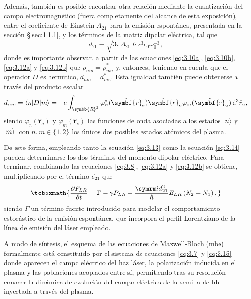 Además, también es posible encontrar otra relación mediante la cuantización del campo electromagnético \autocite{Cohen-Tannoudji2019b} (fuera completamente del alcance de esta exposición), entre el coeficiente de Einstein $A_{21}$ para la emisión espontánea, presentada en la sección \S\ref{sec:1.1.1}, y los términos de la matriz dipolar eléctrica, tal que 
\begin{equation}\label{eq:3.13}
  d_{21} = \sqrt{3 \pi A_{21} \hslash c^{3} \epsilon_{0}\omega^{-3}_{0}}, 
\end{equation}
donde es importante observar, a partir de las ecuaciones \eqref{eq:3.10a}, \eqref{eq:3.10b}, \eqref{eq:3.12a} y \eqref{eq:3.12b} que $\rho_{nm} = \rho^{*}_{mn}$ y, entonces, teniendo en cuenta que el operador $D$ es hermítico, $d_{nm} = d^{*}_{mn}$. Esta igualdad también puede obtenerse a través del producto escalar 
\begin{equation}\label{eq:3.14}
d_{nm} = \Xval{n}{D}{m} = -e \int_{\symbb{R}^{3}} \varphi^{*}_{n}(\hat{\symbf{r}}_{a}) \hat{\symbf{r}}_{a} \varphi_{m}(\hat{\symbf{r}}_{a}) \diff^{3}\hat{r}_{a},
\end{equation}
siendo $\varphi_{n}(\hat{\symbf{r}}_{a})$ y $\varphi_{m}(\hat{\symbf{r}}_{a})$ las funciones de onda asociadas a los estados $|n\rangle$ y $|m\rangle$, con $n, m \in \{1,2\}$ los únicos dos posibles estados atómicos del plasma. 

De este forma, empleando tanto la ecuación \eqref{eq:3.13} como la ecuación \eqref{eq:3.14} pueden determinarse los dos términos del momento dipolar eléctrico.
Para terminar, combinando las ecuaciones \eqref{eq:3.8}, \eqref{eq:3.12a} y \eqref{eq:3.12b} se obtiene, multiplicando por el término $d_{21}$ que
\begin{equation}\label{eq:3.15}
  \tcboxmath{  \pdv{P_{LR}}{t} = \Gamma - \gamma P_{LR} - \frac{\iu d^{2}_{21}}{\hslash }E_{LR}\left(N_{2}-N_{1}\right),}
\end{equation}
siendo $\Gamma$ un término fuente introducido \autocite{Oliva2012} para modelar el comportamiento estocástico de la emisión espontánea, que incorpora el perfil Lorentziano de la línea de emisión del láser empleado. 

A modo de síntesis, el esquema de las ecuaciones de Maxwell-Bloch (\acrshort{mbe}) formalmente está constituido por el sistema de ecuaciones \eqref{eq:3.7} y \eqref{eq:3.15} donde aparecen el campo eléctrico del haz láser, la polarización inducida en el plasma y las poblaciones acoplados entre sí, permitiendo tras su resolución conocer la dinámica de evolución del campo eléctrico de la semilla de \acrshort{hh} inyectada a través del plasma.

